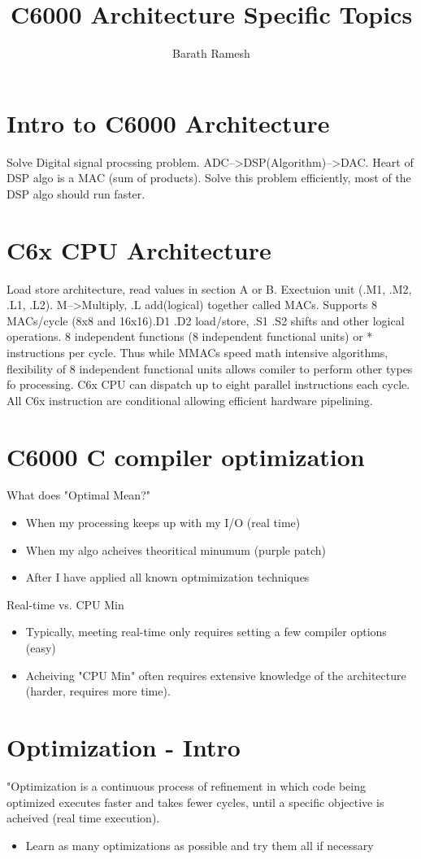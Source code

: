 \documentclass{article}
\author{Barath Ramesh}
\title{C6000 Architecture Specific Topics}
\begin{document}
\maketitle
\tableofcontents
\newpage
\section{Intro to C6000 Architecture}
Solve Digital signal procssing
problem. ADC-->DSP(Algorithm)-->DAC. Heart of DSP algo is a MAC (sum
of products). Solve this problem efficiently, most of the DSP algo
should run faster.
\section{C6x CPU Architecture}
Load store architecture, read values in section A or B. Exectuion unit
(.M1, .M2, .L1, .L2). M-->Multiply, .L add(logical) together called
MACs. Supports 8 MACs/cycle (8x8 and 16x16).D1 .D2
load/store, .S1 .S2 shifts and other logical operations. 8 independent
functions (8 independent functional units) or * instructions per
cycle. Thus while MMACs speed math intensive algorithms, flexibility
of 8 independent functional units allows comiler to perform other
types fo processing. C6x CPU can dispatch up to eight parallel
instructions each cycle. All C6x instruction are conditional allowing
efficient hardware pipelining.
\section{C6000 C compiler optimization}
What does "Optimal Mean?"
\begin{itemize}
\item When my processing keeps up with my I/O (real time)
\item When my algo acheives theoritical minumum (purple patch)
\item After I have applied all known optmimization techniques
\end{itemize}
Real-time vs. CPU Min
\begin{itemize}
\item Typically, meeting real-time only requires setting a few compiler
  options (easy)
\item Acheiving "CPU Min" often requires extensive knowledge
  of the architecture (harder, requires more time).
\end{itemize}
\section{Optimization - Intro}
"Optimization is a continuous process of refinement in which code
being optimized executes faster and takes fewer cycles, until a
specific objective is acheived (real time execution). 
\begin{itemize}
\item Learn as many optimizations as possible and try them all if necessary
\end{itemize}
\end{document}
